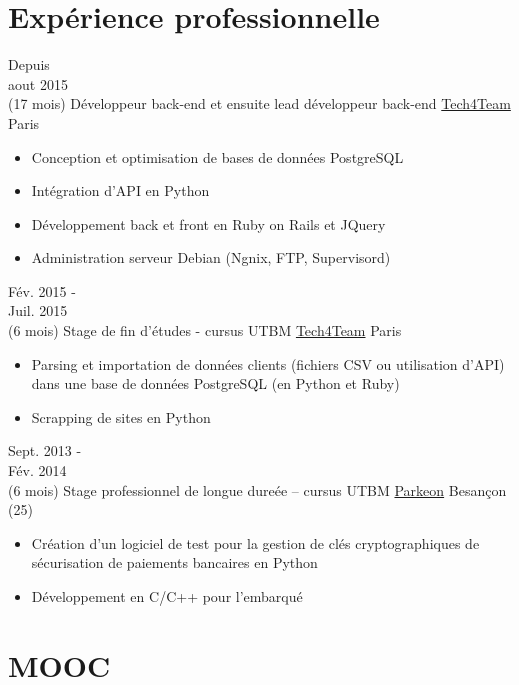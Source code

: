 \documentclass[letterpaper]{twentysecondcv} %
\begin{document}
\section{Expérience professionnelle}
\begin{twenty}
	\twentyitem
    	{Depuis \\ aout 2015 \\ (17 mois)}
        {Développeur back-end et ensuite lead développeur back-end}
        {\href{http://www.tech4team.fr}{Tech4Team}}
        {Paris}
        {
        {\begin{itemize}
        	\item Conception et optimisation de bases de données PostgreSQL
	        \item Intégration d’API en Python
	        \item Développement back et front en Ruby on Rails et JQuery
	        \item Administration serveur Debian (Ngnix, FTP, Supervisord)
	    \end{itemize}}
        }
    \twentyitem
    	{Fév. 2015 - \\ Juil. 2015 \\ (6 mois)}
        {Stage de fin d'études - cursus UTBM}
        {\href{http://www.tech4team.fr}{Tech4Team}}
        {Paris}
        {
        {\begin{itemize}
        	\item Parsing et importation de données clients (fichiers CSV ou utilisation d'API) dans une base de données PostgreSQL (en Python et Ruby)
	        \item Scrapping de sites en Python
	    \end{itemize}}
        }
     \twentyitem
    	{Sept. 2013 - \\ Fév. 2014 \\ (6 mois)}
        {Stage professionnel de longue dureée – cursus UTBM}
        {\href{http://parkeon.fr}{Parkeon}}
        {Besançon (25)}
        {
        {\begin{itemize}
        	\item Création d'un logiciel de test pour la gestion de clés cryptographiques de sécurisation de paiements bancaires en Python
	        \item Développement en C/C++ pour l’embarqué
	    \end{itemize}}
        }
\end{twenty}

\section{MOOC}
\end{document}
